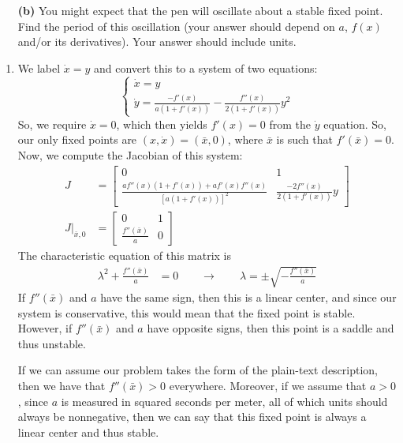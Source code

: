 \documentclass[10pt,letterpaper]{report}
\newcommand{\so}{\qquad \rightarrow \qquad}
\newcommand{\mtx}[2]{\left[\begin{array}{#1}#2\end{array}\right]}
\begin{document}
\begin{enumerate}
\begin{qbox}
\begin{itemize}
    \item[\textbf{(b)}] You might expect that the pen will oscillate about a stable fixed point. Find the period of this oscillation (your answer should depend on $a$, $f(x)$ and/or its derivatives). Your answer should include units.
\end{itemize}
\end{qbox}
\begin{enumerate}
    \item We label $\dot x = y$ and convert this to a system of two equations:
    \[
    \begin{cases}
    \dot x = y \\
    \dot y = \frac{-f'(x)}{a(1 + f'(x))}- \frac{f''(x)}{2(1+f'(x))}y^2
    \end{cases}
    \]
    So, we require $\dot x = 0$, which then yields $f'(x) = 0$ from the $\dot y$ equation. So, our only fixed points are $(x, \dot x) = (\bar x, 0)$, where $\bar x$ is such that $f'(\bar x) = 0$. Now, we compute the Jacobian of this system:
    \begin{align*}
        J &= \mtx{cc}{0 & 1 \\
        \frac{af''(x)(1 + f'(x)) + af'(x)f''(x)}{\left[a(1 + f'(x))\right]^2} & \frac{-2f''(x)}{2(1 + f'(x))}y}
        \\
        J\big\vert_{\bar x, 0} &= \mtx{cc}{0 & 1 \\
        \frac{f''(\bar x)}{a} & 0 }
    \end{align*}
    The characteristic equation of this matrix is
    \begin{align*}
        \lambda^2 + \frac{f''(\bar x)}{a} &= 0 \so \lambda = \pm\sqrt{-\frac{f''(\bar x)}{a}}
    \end{align*}
    If $f''(\bar x)$ and $a$ have the same sign, then this is a linear center, and since our system is conservative, this would mean that the fixed point is stable. However, if $f''(\bar x)$ and $a$ have opposite signs, then this point is a saddle and thus unstable. 
    
    If we can assume our problem takes the form of the plain-text description, then we have that $f''(\bar x) > 0$ everywhere. Moreover, if we assume that $a > 0$, since $a$ is measured in squared seconds per meter, all of which units should always be nonnegative, then we can say that this fixed point is always a linear center and thus stable.
\end{enumerate}


\end{enumerate}
\end{document}
